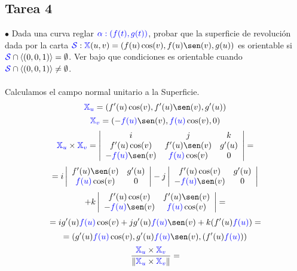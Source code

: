 \documentclass{article}
\newcommand{\bb}[1]{\mathbb{#1}}
\begin{document}
\begin{multicols}{2}
\section*{\textcolor{WildStrawberry}{Tarea 4}}
\noindent $\bullet$ Dada una curva reglar $\textcolor{blue}{\alpha : (f(t), g(t))}$, probar que la superficie de revolución dada por la carta $\textcolor{blue}{\mathcal{S}}: \textcolor{blue}{\bb{X}}(u,v)=(f(u)\cos(v), f(u)\sen(v), g(u))$ es orientable si $\textcolor{blue}{\mathcal{S}}\cap \langle (0,0,1) \rangle = \emptyset$. Ver bajo que condiciones es orientable cuando $\textcolor{blue}{\mathcal{S}}\cap \langle (0,0,1) \rangle \ne \emptyset$.\\
\\
Calculamos el campo normal unitario a la Superficie.
$$
\textcolor{blue}{\bb{X}_u} = (f'(u) \cos(v), f'(u) \sen(v), g'(u))
$$
$$
\textcolor{blue}{\bb{X}_v} = (-\textcolor{blue}{f(u)}\sen(v), \textcolor{blue}{f(u)}\cos(v), 0)
$$
$$
\textcolor{blue}{\bb{X}_u} \times \textcolor{blue}{\bb{X}_v} =
\left|\begin{array}{ccc}
    i & j & k \\
    f'(u) \cos(v) & f'(u) \sen(v) & g'(u) \\
    -\textcolor{blue}{f(u)}\sen(v) & \textcolor{blue}{f(u)}\cos(v) & 0
\end{array}\right|=
$$
$$
=i
\left|\begin{array}{cc}
    f'(u)\sen(v) & g'(u) \\
    \textcolor{blue}{f(u)}\cos(v) & 0 \\
\end{array}\right|
- j
\left|\begin{array}{cc}
    f'(u)\cos(v) & g'(u) \\
    -\textcolor{blue}{f(u)}\sen(v) & 0 \\
\end{array}\right|
$$
$$
+ k
\left|\begin{array}{cc}
    f'(u)\cos(v) & f'(u)\sen(v) \\
    -\textcolor{blue}{f(u)}\sen(v) & \textcolor{blue}{f(u)}\cos(v) \\
\end{array}\right| =
$$
$$
=i g'(u)\textcolor{blue}{f(u)}\cos(v) + j g'(u)\textcolor{blue}{f(u)}\sen(v) + k (f'(u)\textcolor{blue}{f(u)})=
$$
$$
=(g'(u)\textcolor{blue}{f(u)}\cos(v), g'(u)\textcolor{blue}{f(u)}\sen(v), (f'(u)\textcolor{blue}{f(u)}))
$$
$$
\frac{\textcolor{blue}{\bb{X}_u}\times \textcolor{blue}{\bb{X}_v}}{\left\| \textcolor{blue}{\bb{X}_u}\times \textcolor{blue}{\bb{X}_v} \right\|} =
$$
\end{multicols}
\end{document}
